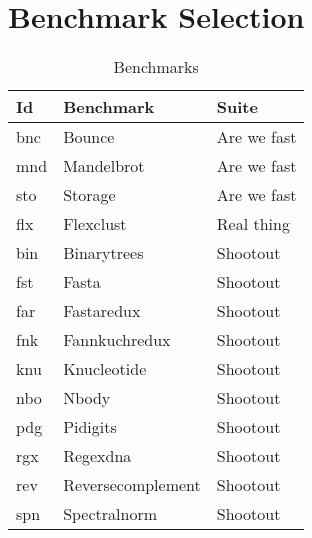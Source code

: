 \documentclass[review,nonacm,screen,acmsmall,anonymous=true]{acmart}
\begin{document}
\appendix

\section{Benchmark Selection}

\begin{table}[!h]
  \vspace{-3mm}
  \small
  \caption{Benchmarks}\label{table:bms}
  \vspace{-3mm}
  \begin{tabular}{lll}
    \toprule
    \bf Id&\bf Benchmark&\bf Suite\\
    \midrule
    bnc&Bounce&Are we fast\\
    mnd&Mandelbrot&Are we fast\\
    sto&Storage&Are we fast\\
    flx&Flexclust&Real thing\\
    bin&Binarytrees&Shootout\\
    fst&Fasta&Shootout\\
    far&Fastaredux&Shootout\\
    fnk&Fannkuchredux&Shootout\\
    knu&Knucleotide&Shootout\\
    nbo&Nbody&Shootout\\
    pdg&Pidigits&Shootout\\
    rgx&Regexdna&Shootout\\
    rev&Reversecomplement&Shootout\\
    spn&Spectralnorm&Shootout\\
    \bottomrule
  \end{tabular}
\end{table}
\end{document}
